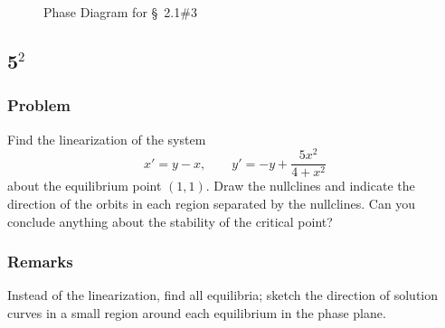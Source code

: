 \documentclass[12pt]{article}
\begin{document}
\begin{figure}
  \centering
  \caption{Phase Diagram for \S~2.1\#3}
  \label{fig:3-phase-diagram}
\end{figure}

\newpage
\subsection{5$^2$}
\subsubsection*{Problem}
Find the linearization of the system
\begin{equation}
  x'=y-x, \qquad y'=-y+\frac{5x^2}{4+x^2}
\end{equation}
about the equilibrium point $(1,1)$. Draw the nullclines and indicate the
direction of the orbits in each region separated by the nullclines. Can you
conclude anything about the stability of the critical point?
\subsubsection*{Remarks}
Instead of the linearization, find all equilibria; sketch the direction of
solution curves in a small region around each equilibrium in the phase plane.
\end{document}
